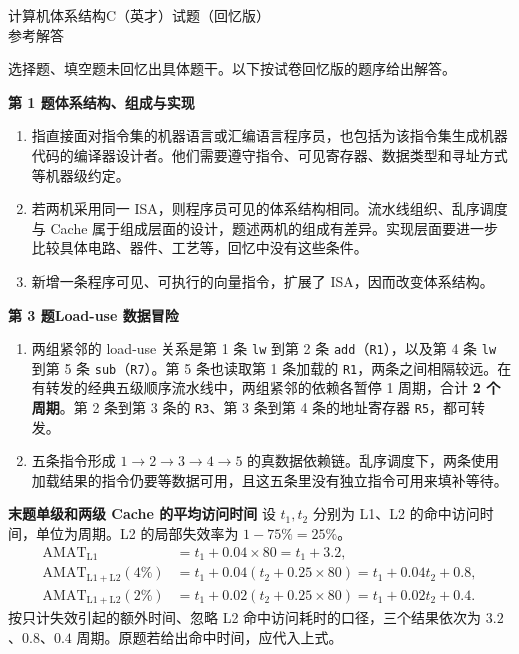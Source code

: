 \documentclass[zihao=-4,a4paper,fontset=windows]{ctexart}
\newcommand{\sect}[1]{\par\needspace{5\baselineskip}\medskip\noindent{\zihao{4}\heiti #1}\par\smallskip}
\begin{document}
\ifdefined\printanswers

\begin{center}
{\LARGE\heiti 计算机体系结构C（英才）试题（回忆版）}\\[4pt]
{\Large\heiti 参考解答}
\end{center}
{选择题、填空题未回忆出具体题干。以下按试卷回忆版的题序给出解答。}

\sect{三、简答题}
\noindent\textbf{第 1 题\quad 体系结构、组成与实现}
\begin{enumerate}[label=(\arabic*)]
\item 指直接面对指令集的机器语言或汇编语言程序员，也包括为该指令集生成机器代码的编译器设计者。他们需要遵守指令、可见寄存器、数据类型和寻址方式等机器级约定。
\item 若两机采用同一 ISA，则程序员可见的体系结构相同。流水线组织、乱序调度与 Cache 属于组成层面的设计，题述两机的组成有差异。实现层面要进一步比较具体电路、器件、工艺等，回忆中没有这些条件。
\item 新增一条程序可见、可执行的向量指令，扩展了 ISA，因而改变体系结构。
\end{enumerate}

\noindent\textbf{第 3 题\quad Load-use 数据冒险}
\begin{enumerate}[label=(\arabic*)]
\item 两组紧邻的 load-use 关系是第 1 条 \texttt{lw} 到第 2 条 \texttt{add}（\texttt{R1}），以及第 4 条 \texttt{lw} 到第 5 条 \texttt{sub}（\texttt{R7}）。第 5 条也读取第 1 条加载的 \texttt{R1}，两条之间相隔较远。在有转发的经典五级顺序流水线中，两组紧邻的依赖各暂停 1 周期，合计 \textbf{2 个周期}。第 2 条到第 3 条的 \texttt{R3}、第 3 条到第 4 条的地址寄存器 \texttt{R5}，都可转发。
\item 五条指令形成 $1\to2\to3\to4\to5$ 的真数据依赖链。乱序调度下，两条使用加载结果的指令仍要等数据可用，且这五条里没有独立指令可用来填补等待。
\end{enumerate}

\medskip
\noindent\textbf{末题\quad 单级和两级 Cache 的平均访问时间}\quad
设 $t_1,t_2$ 分别为 L1、L2 的命中访问时间，单位为周期。L2 的局部失效率为 $1-75\%=25\%$。
\begin{align*}
\mathrm{AMAT}_{\mathrm{L1}} &=t_1+0.04\times80=t_1+3.2,\\
\mathrm{AMAT}_{\mathrm{L1+L2}}(4\%) &=t_1+0.04(t_2+0.25\times80)=t_1+0.04t_2+0.8,\\
\mathrm{AMAT}_{\mathrm{L1+L2}}(2\%) &=t_1+0.02(t_2+0.25\times80)=t_1+0.02t_2+0.4.
\end{align*}
按只计失效引起的额外时间、忽略 L2 命中访问耗时的口径，三个结果依次为 $3.2$、$0.8$、$0.4$ 周期。原题若给出命中时间，应代入上式。
\end{document}
